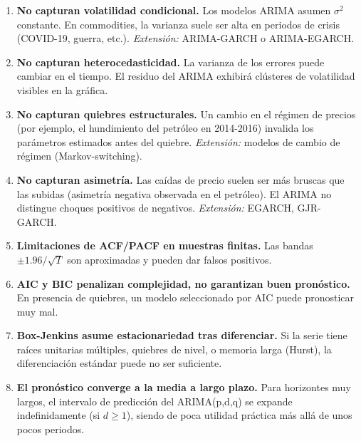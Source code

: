 \documentclass[12pt,a4paper]{article}
\theoremstyle{definition}
\begin{document}
\begin{warnbox}
\begin{enumerate}
  \item \textbf{No capturan volatilidad condicional.} Los modelos ARIMA asumen
        $\sigma^2$ constante. En commodities, la varianza suele ser alta en
        periodos de crisis (COVID-19, guerra, etc.).
        \textit{Extensión:} ARIMA-GARCH o ARIMA-EGARCH.

  \item \textbf{No capturan heterocedasticidad.} La varianza de los errores puede
        cambiar en el tiempo. El residuo del ARIMA exhibirá clústeres de
        volatilidad visibles en la gráfica.

  \item \textbf{No capturan quiebres estructurales.} Un cambio en el régimen de
        precios (por ejemplo, el hundimiento del petróleo en 2014-2016) invalida
        los parámetros estimados antes del quiebre.
        \textit{Extensión:} modelos de cambio de régimen (Markov-switching).

  \item \textbf{No capturan asimetría.} Las caídas de precio suelen ser más
        bruscas que las subidas (asimetría negativa observada en el petróleo).
        El ARIMA no distingue choques positivos de negativos.
        \textit{Extensión:} EGARCH, GJR-GARCH.

  \item \textbf{Limitaciones de ACF/PACF en muestras finitas.} Las bandas
        $\pm 1.96/\sqrt{T}$ son aproximadas y pueden dar falsos positivos.

  \item \textbf{AIC y BIC penalizan complejidad, no garantizan buen pronóstico.}
        En presencia de quiebres, un modelo seleccionado por AIC puede pronosticar
        muy mal.

  \item \textbf{Box-Jenkins asume estacionariedad tras diferenciar.} Si la serie
        tiene raíces unitarias múltiples, quiebres de nivel, o memoria larga
        (Hurst), la diferenciación estándar puede no ser suficiente.

  \item \textbf{El pronóstico converge a la media a largo plazo.} Para horizontes
        muy largos, el intervalo de predicción del ARIMA(p,d,q) se expande
        indefinidamente (si $d \geq 1$), siendo de poca utilidad práctica más
        allá de unos pocos periodos.
\end{enumerate}
\end{warnbox}
\end{document}
